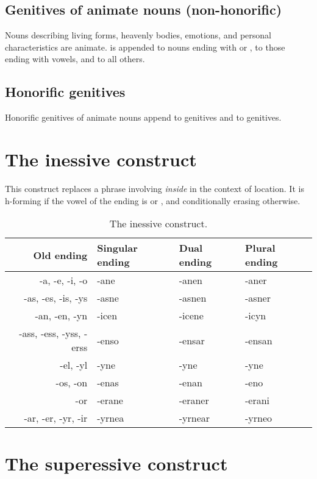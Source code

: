 \documentclass{book}
\begin{document}
\subsection{Genitives of animate nouns (non-honorific)}

Nouns describing living forms, heavenly bodies, emotions, and personal characteristics are animate.  is appended to nouns ending with  or ,  to those ending with vowels, and  to all others.

\subsection{Honorific genitives}

Honorific genitives of animate nouns append  to  genitives and  to  genitives.

\section{The inessive construct}

This construct replaces a phrase involving  \emph{inside} in the context of location. It is h-forming if the vowel of the ending is  or , and conditionally erasing otherwise.

\begin{table}[H]
  \caption{The inessive construct.}
  \centering
  \begin{tabular}{|r|l|l|l|}
    \hline
    Old ending & Singular ending & Dual ending & Plural ending \\ \hline
    -a, -e, -i, -o & -ane & -anen & -aner \\
    -as, -es, -is, -ys & -asne & -asnen & -asner \\
    -an, -en, -yn & -icen & -icene & -icyn \\
    -ass, -ess, -yss, -erss & -enso & -ensar & -ensan \\
    -el, -yl & -yne & -yne & -yne \\
    -os, -on & -enas & -enan & -eno \\
    -or & -erane & -eraner & -erani \\
    -ar, -er, -yr, -ir & -yrnea & -yrnear & -yrneo \\ \hline
  \end{tabular}
\end{table}

\section{The superessive construct}
\end{document}
